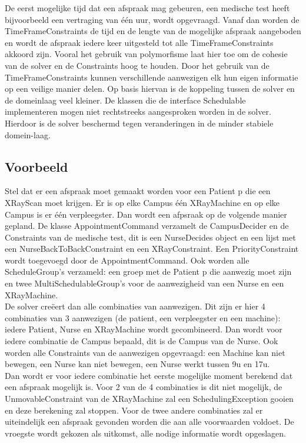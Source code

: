 De eerst mogelijke tijd dat een afspraak mag gebeuren, een medische test heeft bijvoorbeeld een vertraging van één uur, wordt opgevraagd. 
Vanaf dan worden de TimeFrameConstraints de tijd en de lengte van de mogelijke afspraak aangeboden en wordt de afspraak iedere keer uitgesteld tot alle TimeFrameConstraints akkoord zijn. 
Vooral het gebruik van polymorfisme laat hier toe om de cohesie van de solver en de Constraints hoog te houden. 
Door het gebruik van de TimeFrameConstraints kunnen verschillende aanwezigen elk hun eigen informatie op een veilige manier delen. 
Op basis hiervan is de koppeling tussen de solver en de domeinlaag veel kleiner. 
De klassen die de interface Schedulable implementeren mogen niet rechtstreeks aangesproken worden in de solver. 
Hierdoor is de solver beschermd tegen veranderingen in de minder stabiele domein-laag.

\subsection{Voorbeeld}
Stel dat er een afspraak moet gemaakt worden voor een Patient p die een XRayScan moet krijgen. 
Er is op elke Campus één XRayMachine en op elke Campus is er één verpleegster. 
Dan wordt een afpsraak op de volgende manier gepland. 
De klasse AppointmentCommand verzamelt de CampusDecider en de Constraints van de medische test, dit is een NurseDecides object en een lijst met een NurseBackToBackConstraint en een XRayConstraint.
Een PriorityConstraint wordt toegevoegd door de AppointmentCommand.
Ook worden alle ScheduleGroup's verzameld: een groep met de Patient p die aanwezig moet zijn en twee MultiSchedulableGroup's voor de aanwezigheid van een Nurse en een XRayMachine. \\

De solver creëert dan alle combinaties van aanwezigen. Dit zijn er hier 4 combinaties van 3 aanwezigen (de patient, een verpleegster en een machine): iedere Patient, Nurse en XRayMachine wordt gecombineerd. 
Dan wordt voor iedere combinatie de Campus bepaald, dit is de Campus van de Nurse. 
Ook worden alle Constraints van de aanwezigen opgevraagd: een Machine kan niet bewegen, een Nurse kan niet bewegen, een Nurse werkt tussen 9u en 17u. \\

Dan wordt er voor iedere combinatie het eerste mogelijke moment berekend dat een afspraak mogelijk is. 
Voor 2 van de 4 combinaties is dit niet mogelijk, de UnmovableConstraint van de XRayMachine zal een SchedulingException gooien en deze berekening zal stoppen. 
Voor de twee andere combinaties zal er uiteindelijk een afspraak gevonden worden die aan alle voorwaarden voldoet. 
De vroegste wordt gekozen als uitkomst, alle nodige informatie wordt opgeslagen.



